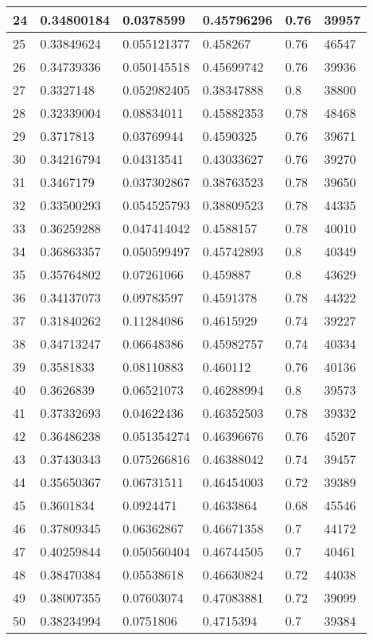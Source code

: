 \begin{longtable}{|l|l|l|l|l|l|}
24 & 0.34800184 & 0.0378599 & 0.45796296 & 0.76 & 39957 \\ \hline 
25 & 0.33849624 & 0.055121377 & 0.458267 & 0.76 & 46547 \\ \hline 
26 & 0.34739336 & 0.050145518 & 0.45699742 & 0.76 & 39936 \\ \hline 
27 & 0.3327148 & 0.052982405 & 0.38347888 & 0.8 & 38800 \\ \hline 
28 & 0.32339004 & 0.08834011 & 0.45882353 & 0.78 & 48468 \\ \hline 
29 & 0.3717813 & 0.03769944 & 0.4590325 & 0.76 & 39671 \\ \hline 
30 & 0.34216794 & 0.04313541 & 0.43033627 & 0.76 & 39270 \\ \hline 
31 & 0.3467179 & 0.037302867 & 0.38763523 & 0.78 & 39650 \\ \hline 
32 & 0.33500293 & 0.054525793 & 0.38809523 & 0.78 & 44335 \\ \hline 
33 & 0.36259288 & 0.047414042 & 0.4588157 & 0.78 & 40010 \\ \hline 
34 & 0.36863357 & 0.050599497 & 0.45742893 & 0.8 & 40349 \\ \hline 
35 & 0.35764802 & 0.07261066 & 0.459887 & 0.8 & 43629 \\ \hline 
36 & 0.34137073 & 0.09783597 & 0.4591378 & 0.78 & 44322 \\ \hline 
37 & 0.31840262 & 0.11284086 & 0.4615929 & 0.74 & 39227 \\ \hline 
38 & 0.34713247 & 0.06648386 & 0.45982757 & 0.74 & 40334 \\ \hline 
39 & 0.3581833 & 0.08110883 & 0.460112 & 0.76 & 40136 \\ \hline 
40 & 0.3626839 & 0.06521073 & 0.46288994 & 0.8 & 39573 \\ \hline 
41 & 0.37332693 & 0.04622436 & 0.46352503 & 0.78 & 39332 \\ \hline 
42 & 0.36486238 & 0.051354274 & 0.46396676 & 0.76 & 45207 \\ \hline 
43 & 0.37430343 & 0.075266816 & 0.46388042 & 0.74 & 39457 \\ \hline 
44 & 0.35650367 & 0.06731511 & 0.46454003 & 0.72 & 39389 \\ \hline 
45 & 0.3601834 & 0.0924471 & 0.4633864 & 0.68 & 45546 \\ \hline 
46 & 0.37809345 & 0.06362867 & 0.46671358 & 0.7 & 44172 \\ \hline 
47 & 0.40259844 & 0.050560404 & 0.46744505 & 0.7 & 40461 \\ \hline 
48 & 0.38470384 & 0.05538618 & 0.46630824 & 0.72 & 44038 \\ \hline 
49 & 0.38007355 & 0.07603074 & 0.47083881 & 0.72 & 39099 \\ \hline 
50 & 0.38234994 & 0.0751806 & 0.4715394 & 0.7 & 39384 \\ \hline 
\end{longtable}